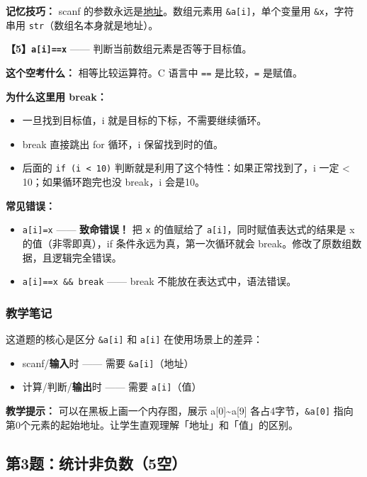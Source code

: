 \textbf{记忆技巧：} scanf 的参数永远是\underline{地址}。数组元素用 \texttt{\&a[i]}，单个变量用 \texttt{\&x}，字符串用 \texttt{str}（数组名本身就是地址）。

\vspace{0.6em}
\textbf{【5】\texttt{a[i]==x}} —— 判断当前数组元素是否等于目标值。

\vspace{0.3em}
\textbf{这个空考什么：} 相等比较运算符。C 语言中 \texttt{==} 是比较，\texttt{=} 是赋值。

\textbf{为什么这里用 break：}
\begin{itemize}
    \item 一旦找到目标值，i 就是目标的下标，不需要继续循环。
    \item break 直接跳出 for 循环，i 保留找到时的值。
    \item 后面的 \texttt{if (i < 10)} 判断就是利用了这个特性：如果正常找到了，i 一定 < 10；如果循环跑完也没 break，i 会是10。
\end{itemize}

\textbf{常见错误：}
\begin{itemize}
    \item \texttt{a[i]=x} —— \textbf{致命错误！} 把 \texttt{x} 的值赋给了 \texttt{a[i]}，同时赋值表达式的结果是 x 的值（非零即真），if 条件永远为真，第一次循环就会 break。修改了原数组数据，且逻辑完全错误。
    \item \texttt{a[i]==x \&\& break} —— break 不能放在表达式中，语法错误。
\end{itemize}

\subsubsection{教学笔记}

这道题的核心是区分 \texttt{\&a[i]} 和 \texttt{a[i]} 在使用场景上的差异：
\begin{itemize}
    \item scanf/\textbf{输入}时 —— 需要 \texttt{\&a[i]}（地址）
    \item 计算/判断/\textbf{输出}时 —— 需要 \texttt{a[i]}（值）
\end{itemize}

\textbf{教学提示：} 可以在黑板上画一个内存图，展示 a[0]\~{}a[9] 各占4字节，\texttt{\&a[0]} 指向第0个元素的起始地址。让学生直观理解「地址」和「值」的区别。

\bigskip
\bigskip

\subsection{第3题：统计非负数（5空）}

